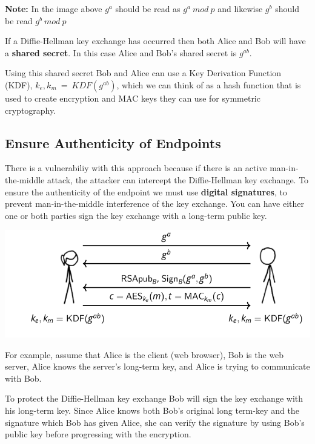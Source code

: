 \documentclass[11pt]{article} %
\begin{document}
{\parindent0pt \textbf{Note:} In the image above $g^{a}$  should be read as 
$g^{a}\ mod\ p$ and likewise $g^{b}$ should be read $g^{b}\ mod\ p$}

\bigskip
{\parindent0pt If a Diffie-Hellman key exchange has occurred then both Alice 
and Bob will have a \textbf{shared secret}. In this case Alice and Bob's shared
secret is $g^{ab}$.}

\bigskip
{\parindent0pt Using this shared secret Bob and Alice can use a Key Derivation
Function (KDF), 
\smallskip
$k_e, k_m\ =\ KDF(g^{ab})$, which we can think of as a hash function that is 
used to create encryption and MAC keys they can use for symmetric cryptography.}

\subsection{Ensure Authenticity of Endpoints}
{\parindent0pt There is a vulnerabiliy with this approach because if there is 
an active man-in-the-middle attack, the attacker can intercept the Diffie-Hellman
key exchange.  To ensure the authenticity of the endpoint we must use
\textbf{digital signatures}, to prevent man-in-the-middle interference of the
key exchange.
You can have either one or both parties sign the key exchange with a long-term
public key.}

\begin{center}
	\includegraphics[scale=.7]{./tls3.png}
\end{center}

{\parindent0pt For example, assume that Alice is the client (web browser), Bob 
is the web server, Alice knows the server's long-term key, and Alice is trying 
to communicate with Bob.}

\bigskip
{\parindent0pt To protect the Diffie-Hellman key exchange Bob will sign the key
exchange with his long-term key.  Since Alice knows both Bob's original long 
term-key and the signature which Bob has given Alice, she can verify the 
signature by using Bob's public key before progressing with the encryption.}
\end{document}
